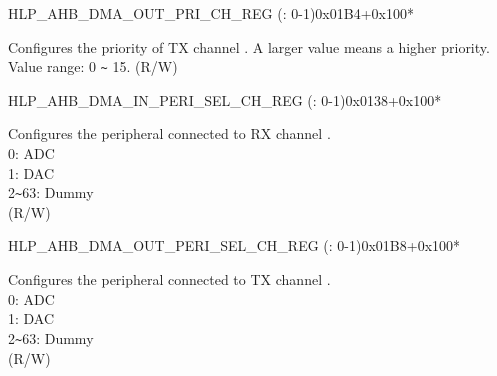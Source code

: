 \begin{register}{H}{LP\_AHB\_DMA\_OUT\_PRI\_CH\_REG (: 0-1)}{0x01B4+0x100*}\label{regdesc:LPAHBDMAOUTPRICHNREG}
%
%
\regnewline%
\begin{regdesc}\begin{reglist}
\label{fielddesc:LPAHBDMATXPRICHN}\item [LP\_AHB\_DMA\_TX\_PRI\_CH\regindex{n}] Configures the priority of TX channel . A larger value means a higher priority. Value range: 0 \verb+~+ 15. (R/W)
\end{reglist}\end{regdesc}
\end{register}


\begin{register}{H}{LP\_AHB\_DMA\_IN\_PERI\_SEL\_CH\_REG (: 0-1)}{0x0138+0x100*}\label{regdesc:LPAHBDMAINPERISELCHNREG}
%
%
\regnewline%
\begin{regdesc}\begin{reglist}
\label{fielddesc:LPAHBDMAPERIINSELCHN}\item [LP\_AHB\_DMA\_PERI\_IN\_SEL\_CH\regindex{n}] Configures the peripheral connected to RX channel .\\ 0: ADC\\ 1: DAC\\ 2\verb+~+63: Dummy \\ (R/W)
\end{reglist}\end{regdesc}
\end{register}


\begin{register}{H}{LP\_AHB\_DMA\_OUT\_PERI\_SEL\_CH\_REG (: 0-1)}{0x01B8+0x100*}\label{regdesc:LPAHBDMAOUTPERISELCHNREG}
%
%
\regnewline%
\begin{regdesc}\begin{reglist}
\label{fielddesc:LPAHBDMAPERIOUTSELCHN}\item [LP\_AHB\_DMA\_PERI\_OUT\_SEL\_CH\regindex{n}] Configures the peripheral connected to TX channel .\\ 0: ADC\\ 1: DAC\\ 2\verb+~+63: Dummy \\ (R/W)
\end{reglist}\end{regdesc}
\end{register}

